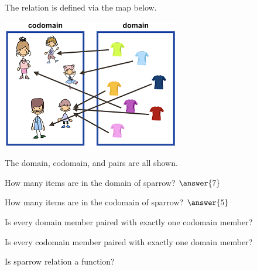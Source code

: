 \documentclass{ximera}
\begin{document}
  
  \begin{definition}
The relation  is defined via the map below.

  \includegraphics[width=293px,height=213px]{pics/r2.png}
  
  The domain, codomain, and pairs are all shown.


  
  \end{definition}
  


\begin{exercise}
How many items are in the domain of sparrow? $\answer{7}$
\end{exercise}


\begin{exercise}
How many items are in the codomain of sparrow? $\answer{5}$
\end{exercise}




\begin{exercise}
Is every domain member paired with exactly one codomain member?

  \begin{multipleChoice}
  \end{multipleChoice}
\end{exercise}


\begin{exercise}
Is every codomain member paired with exactly one domain member?

  \begin{multipleChoice}
  \end{multipleChoice}
\end{exercise}



\begin{exercise}
Is sparrow relation a function?

  \begin{multipleChoice}
  \end{multipleChoice}
\end{exercise}
\end{document}
